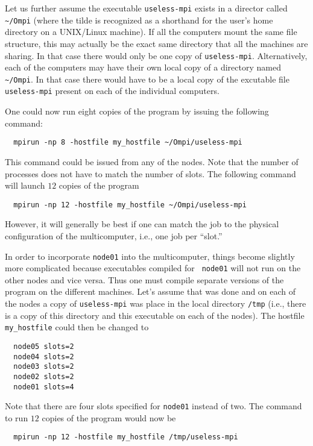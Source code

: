 Let us further assume the executable {\tt useless-mpi} exists in a
director called \verb+~/Ompi+ (where the tilde is recognized as a
shorthand for the user's home directory on a UNIX/Linux machine).  If
all the computers mount the same file structure, this may actually be
the exact same directory that all the machines are sharing.  In that
case there would only be one copy of {\tt useless-mpi}.
Alternatively, each of the computers may have their own local copy of
a directory named \verb+~/Ompi+.  In that case there would have to be
a local copy of the excutable file {\tt useless-mpi} present on each
of the individual computers.

One could now run eight copies of the program by issuing the following
command:
\begin{verbatim}
  mpirun -np 8 -hostfile my_hostfile ~/Ompi/useless-mpi
\end{verbatim}
This command could be issued from any of the nodes.  Note that the
number of processes does not have to match the number of slots.  The
following command will launch $12$ copies of the program
\begin{verbatim}
  mpirun -np 12 -hostfile my_hostfile ~/Ompi/useless-mpi
\end{verbatim}
However, it will generally be best if one can match the job to the
physical configuration of the multicomputer, i.e., one job per
``slot.''  

In order to incorporate {\tt node01} into the multicomputer, things
become slightly more complicated because executables compiled for {\tt
  node01} will not run on the other nodes and vice versa.  Thus one
must compile separate versions of the program on the different
machines.  Let's assume that was done and on each of the nodes a copy
of {\tt useless-mpi} was place in the local directory {\tt /tmp}
(i.e., there is a copy of this directory and this executable on each
of the nodes).  The hostfile {\tt my\_hostfile} could then be changed
to
\begin{verbatim}
  node05 slots=2
  node04 slots=2
  node03 slots=2
  node02 slots=2
  node01 slots=4
\end{verbatim}
Note that there are four slots specified for {\tt node01} instead of
two.  The command to run $12$ copies of the program would now be
\begin{verbatim}
  mpirun -np 12 -hostfile my_hostfile /tmp/useless-mpi
\end{verbatim}

